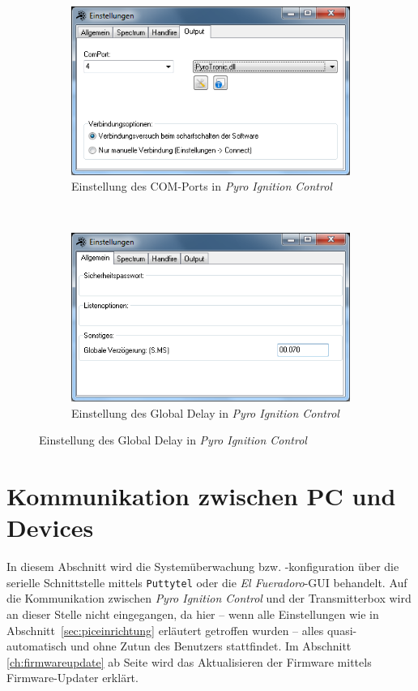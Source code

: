 \documentclass[pdftex, parskip, numbers=noenddot, toc=listof]{scrbook}
\newcommand{\pic}{\emph{Pyro Ignition Control}}
\newcommand{\anlage}{\emph{El Fueradoro}}
\begin{document}
	\begin{figure}
		\begin{subfigure}[t]{\textwidth}
			\centering
			\includegraphics[width=.75\textwidth]{Bilder/pic-comport}
			\caption{Einstellung des COM-Ports in {\pic}}
			\label{fig:pic-comport}
		\end{subfigure} \\[50pt]
		\begin{subfigure}[t]{\textwidth}
			\centering
			\includegraphics[width=.75\textwidth]{Bilder/pic-delay}
			\caption{Einstellung des Global Delay in \pic}
			\label{fig:pic-delay}
		\end{subfigure}
	\end{figure}

	\chapter{Kommunikation zwischen PC und Devices}
	\label{ch:kommunikationpc}

	In diesem Abschnitt wird die Systemüberwachung bzw. -konfiguration über die serielle Schnittstelle mittels \texttt{Puttytel} oder die {\anlage}-GUI behandelt. Auf die Kommunikation zwischen {\pic} und der Transmitterbox wird an dieser Stelle nicht eingegangen, da hier -- wenn alle Einstellungen wie in Abschnitt~\ref{sec:piceinrichtung} erläutert getroffen wurden -- alles quasi-automatisch und ohne Zutun des Benutzers stattfindet. Im Abschnitt \ref{ch:firmwareupdate} ab Seite \pageref{ch:firmwareupdate} wird das Aktualisieren der Firmware mittels Firmware-Updater erklärt.
\end{document}

